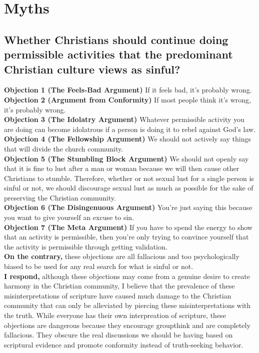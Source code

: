 \documentclass[a4paper, parskip=full, 12spt]{article}
\begin{document}
\section{Myths}
\subsection{Whether Christians should continue doing permissible activities that the predominant Christian culture views as sinful?}
\textbf{Objection 1 (The Feels-Bad Argument)} If it feels bad, it's probably wrong. \\
\textbf{Objection 2 (Argument from Conformity)} If most people think it's wrong, it's probably wrong. \\
\textbf{Objection 3 (The Idolatry Argument)} Whatever permissible activity you are doing can become idolatrous if a person is doing it to rebel against God's law.\\
\textbf{Objection 4 (The Fellowship Argument)} We should not actively say things that will divide the church community. \\
\textbf{Objection 5 (The Stumbling Block Argument)} We should not openly say that it is fine to lust after a man or woman because we will then cause other Christians to stumble. Therefore, whether or not sexual lust for a single person is sinful or not, we should discourage sexual lust as much as possible for the sake of preserving the Christian community. \\
\textbf{Objection 6 (The Disingenuous Argument)} You're just saying this because you want to give yourself an excuse to sin. \\
\textbf{Objection 7 (The Meta Argument)} If you have to spend the energy to show that an activity is permissible, then you're only trying to convince yourself that the activity is permissible through getting validation. \\
\textbf{On the contrary,} these objections are all fallacious and too psychologically biased to be used for any real search for what is sinful or not. \\
\textbf{I respond,} although these objections may come from a genuine desire to create harmony in the Christian community, I believe that the prevalence of these misinterpretations of scripture have caused much damage to the Christian community that can only be alleviated by piercing these misinterpretations with the truth. While everyone has their own interpreation of scripture, these objections are dangerous because they encourage groupthink and are completely fallacious. They obscure the real discussions we should be having based on scriptural evidence and promote conformity instead of truth-seeking behavior. \\
\end{document}
